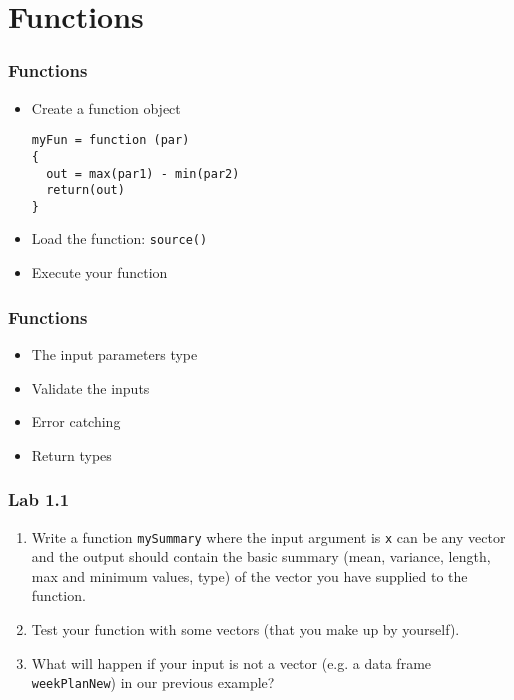 \documentclass[10pt]{beamer}
\begin{document}
\section{Functions}
\begin{frame}[fragile]
  \frametitle{Functions}

  \begin{itemize}
  \item Create a function object
\begin{verbatim}
myFun = function (par)
{
  out = max(par1) - min(par2)
  return(out)
}

\end{verbatim}

    \item Load the function: \texttt{source()}

    \item Execute your function

  \end{itemize}

\end{frame}

\begin{frame}
  \frametitle{Functions}

  \begin{itemize}
  \item The input parameters type
  \item Validate the inputs
  \item Error catching
  \item Return types
  \end{itemize}
\end{frame}




\begin{frame}
\frametitle{Lab 1.1}
  \begin{enumerate}
\item Write a function \texttt{mySummary} where the input argument is
  \texttt{x} can be any vector and the output should contain the basic
  summary (mean, variance, length,
  max and minimum values, type) of the vector you have
  supplied to the function.
\item Test your function with some vectors (that you make up by yourself).
\item What will happen if your input is not a vector (e.g. a data frame \texttt{weekPlanNew})
  in our previous example?
\end{enumerate}


\end{frame}
\end{document}
